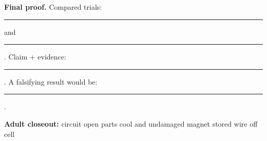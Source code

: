 \smallskip
\textbf{Final proof.} Compared trials: \rule{1.1cm}{.3pt} and
\rule{1.1cm}{.3pt}. Claim + evidence:
\rule{4.6cm}{.3pt}. A falsifying result would be:
\rule{3.0cm}{.3pt}.

\textbf{Adult closeout:} \fbox{\rule{0pt}{.8ex}\hspace{.8ex}} circuit open \quad
\fbox{\rule{0pt}{.8ex}\hspace{.8ex}} parts cool and undamaged \quad
\fbox{\rule{0pt}{.8ex}\hspace{.8ex}} magnet stored \quad
\fbox{\rule{0pt}{.8ex}\hspace{.8ex}} wire off cell
\tiny

